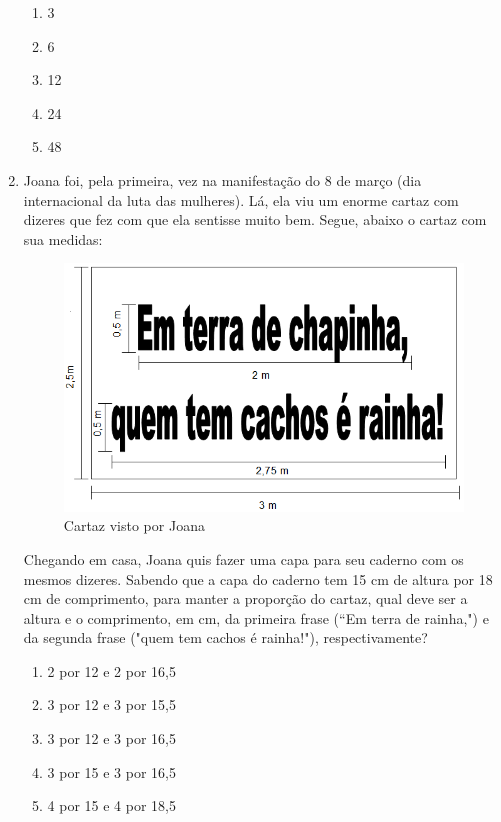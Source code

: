 \documentclass[10pt,a4paper]{article}
\begin{document}
\begin{multicols}{2}
\begin{enumerate}
		\begin{enumerate}
		\item 3
		\item 6
		\item 12
		\item 24
		\item 48
		\end{enumerate}

	\item Joana foi, pela primeira, vez na manifesta\c{c}\~{a}o do 8 de mar\c{c}o (dia internacional da luta das mulheres). L\'a, ela viu um enorme cartaz com dizeres que fez com que ela sentisse muito bem. Segue, abaixo o cartaz com sua medidas:

\begin{figure}
     \centering
     \includegraphics[scale=0.1]{cartaz.png}
     \caption{Cartaz visto por Joana}
     \label{cartaz_joana}
\end{figure}

Chegando em casa, Joana quis fazer uma capa para seu caderno com os mesmos dizeres. Sabendo que a capa do caderno tem 15 cm de altura por 18 cm de comprimento, para manter a propor\c{c}\~{a}o do cartaz, qual deve ser a altura e o comprimento, em cm, da primeira frase (``Em terra de rainha,") e da segunda frase ("quem tem cachos \'e rainha!"), respectivamente?

		\begin{enumerate}
		\item 2 por 12 e 2 por 16,5
		\item 3 por 12 e 3 por 15,5
		\item 3 por 12 e 3 por 16,5
		\item 3 por 15 e 3 por 16,5
		\item 4 por 15 e 4 por 18,5
		\end{enumerate}


\end{enumerate}
\end{multicols}
\end{document}
